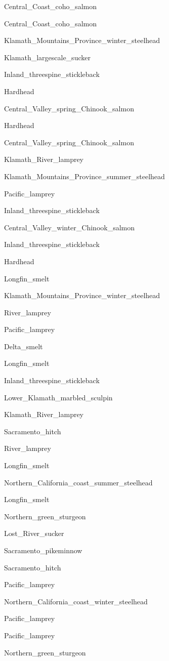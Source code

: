 \documentclass[]{article}
\begin{document}
Central\_Coast\_coho\_salmon

Central\_Coast\_coho\_salmon

Klamath\_Mountains\_Province\_winter\_steelhead

Klamath\_largescale\_sucker

Inland\_threespine\_stickleback

Hardhead

Central\_Valley\_spring\_Chinook\_salmon

Hardhead

Central\_Valley\_spring\_Chinook\_salmon

Klamath\_River\_lamprey

Klamath\_Mountains\_Province\_summer\_steelhead

Pacific\_lamprey

Inland\_threespine\_stickleback

Central\_Valley\_winter\_Chinook\_salmon

Inland\_threespine\_stickleback

Hardhead

Longfin\_smelt

Klamath\_Mountains\_Province\_winter\_steelhead

River\_lamprey

Pacific\_lamprey

Delta\_smelt

Longfin\_smelt

Inland\_threespine\_stickleback

Lower\_Klamath\_marbled\_sculpin

Klamath\_River\_lamprey

Sacramento\_hitch

River\_lamprey

Longfin\_smelt

Northern\_California\_coast\_summer\_steelhead

Longfin\_smelt

Northern\_green\_sturgeon

Lost\_River\_sucker

Sacramento\_pikeminnow

Sacramento\_hitch

Pacific\_lamprey

Northern\_California\_coast\_winter\_steelhead

Pacific\_lamprey

Pacific\_lamprey

Northern\_green\_sturgeon
\end{document}
